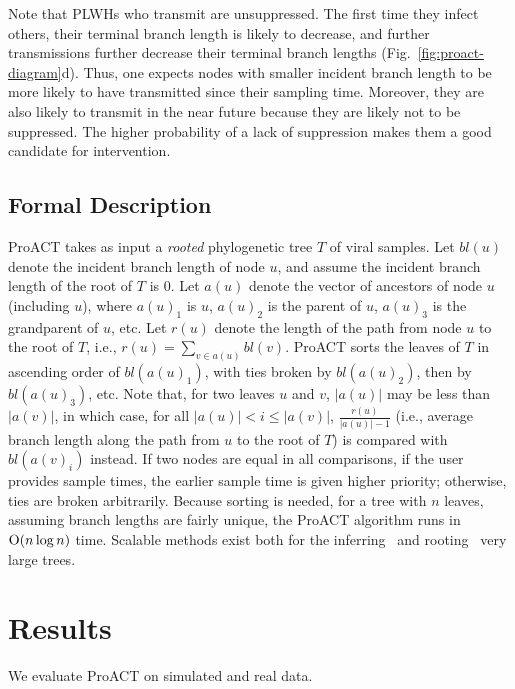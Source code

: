 Note that \glspl{PLWH} who transmit are unsuppressed. The first time they infect others, their terminal branch length is likely to decrease, and further transmissions further decrease their terminal branch lengths (Fig.~\ref{fig:proact-diagram}d). Thus, one expects nodes with smaller incident branch length to be more likely to have transmitted since their sampling time. Moreover, they are also likely to transmit in the near future because they are likely not to be suppressed. The higher probability of a lack of suppression makes them a good candidate for intervention.

\subsection{Formal Description}
ProACT takes as input a \textit{rooted} phylogenetic tree $T$ of viral samples. Let $bl(u)$ denote the incident branch length of node $u$, and assume the incident branch length of the root of $T$ is 0. Let $a(u)$ denote the vector of ancestors of node $u$ (including $u$), where $a(u)_1$ is $u$, $a(u)_2$ is the parent of $u$, $a(u)_3$ is the grandparent of $u$, etc. Let $r(u)$ denote the length of the path from node $u$ to the root of $T$, i.e., $r(u)=\sum_{v\in a(u)}{bl(v)}$. ProACT sorts the leaves of $T$ in ascending order of $bl(a(u)_1)$, with ties broken by $bl(a(u)_2)$, then by $bl(a(u)_3)$, etc. Note that, for two leaves $u$ and $v$, $|a(u)|$ may be less than $|a(v)|$, in which case, for all $|a(u)|<i\le|a(v)|$, $\frac{r(u)}{|a(u)|-1}$ (i.e., average branch length along the path from $u$ to the root of $T$) is compared with $bl(a(v)_i)$ instead. If two nodes are equal in all comparisons, if the user provides sample times, the earlier sample time is given higher priority; otherwise, ties are broken arbitrarily. Because sorting is needed, for a tree with $n$ leaves, assuming branch lengths are fairly unique, the ProACT algorithm runs in $\textrm{O}(n\log n)$ time. Scalable methods exist both for the inferring~\cite{Price2010,Nguyen2015} and rooting~\cite{Mai2017} very large trees.

\section{Results}
We evaluate ProACT on simulated and real data.

